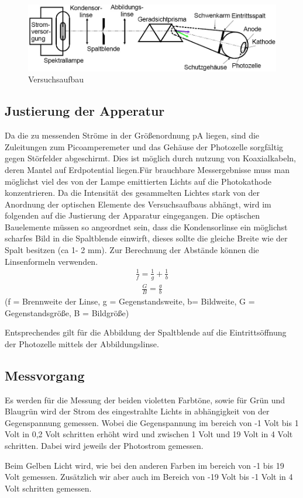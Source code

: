 \begin{figure}[h]
	\centering
		\includegraphics[width=1.00\textwidth]{Versuchsaufbau.jpg}
		\caption{Versuchsaufbau}
	\label{fig:Versuchsaufbau}
\end{figure}

\subsection{Justierung der Apperatur}
Da die zu messenden Ströme in der Größenordnung pA liegen, sind die Zuleitungen zum Picoamperemeter und
das Gehäuse der Photozelle sorgfältig gegen Störfelder abgeschirmt. Dies ist möglich durch nutzung von Koaxialkabeln,
deren Mantel auf Erdpotential liegen.Für brauchbare Messergebnisse muss man möglichst viel des von der Lampe emittierten
Lichts auf die Photokathode konzentrieren. Da die Intensität des gesammelten Lichtes stark von der Anordnung der optischen
Elemente des Versuchsaufbaus abhängt, wird im folgenden auf die Justierung der Apparatur eingegangen.
Die optischen Bauelemente müssen so angeordnet sein, dass die Kondensorlinse ein möglichst scharfes Bild in die Spaltblende einwirft,
dieses sollte die gleiche Breite wie der Spalt besitzen (ca 1- 2 mm). Zur Berechnung der Abstände können die Linsenformeln verwenden.
\begin{align}
\frac{1}{f}=\frac{1}{g}+\frac{1}{b}
\end{align}
\begin{align}
\frac{G}{B}=\frac{g}{b}
\end{align}
(f = Brennweite der Linse, g = Gegenstandsweite, b= Bildweite, G = Gegenstandsgröße, B = Bildgröße)

Entsprechendes gilt für die Abbildung der Spaltblende auf die Eintrittsöffnung der Photozelle mittels der Abbildungslinse.

\subsection{Messvorgang}
Es werden für die Messung der beiden violetten Farbtöne, sowie für Grün und Blaugrün
wird der Strom des eingestrahlte Lichts in abhängigkeit von der Gegenspannung gemessen.
Wobei die Gegenspannung im bereich von -1 Volt bis 1 Volt in 0,2 Volt schritten erhöht wird und
zwischen 1 Volt und 19 Volt in 4 Volt schritten. Dabei wird jeweils der Photostrom gemessen.

Beim Gelben Licht wird, wie bei den anderen Farben im bereich von -1 bis 19 Volt gemessen.
Zusätzlich wir aber auch im Bereich von -19 Volt bis -1 Volt in 4 Volt schritten gemessen.